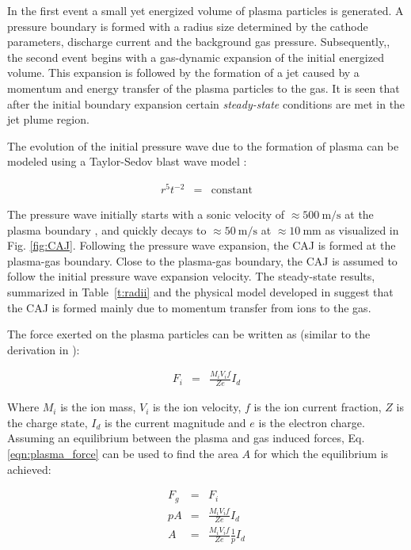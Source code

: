 \documentclass[a4paper]{iacas}%
\begin{document}
In the first event a small yet energized volume of plasma particles is generated. A pressure boundary is formed with a radius size determined by the cathode parameters, discharge current and the background gas pressure.
Subsequently,\cite{boxman1990momentum}, the second event begins with a gas-dynamic expansion of the initial energized volume. This expansion is followed by the formation of a jet caused by a momentum and energy transfer of the plasma particles to the gas. It is seen that after the initial boundary expansion certain \textit{steady-state} conditions are met in the jet plume region. 

The evolution of the initial pressure wave due to the formation of plasma can be modeled using a Taylor-Sedov blast wave model \cite{TAYLOR,SEDOV}: 

\begin{eqnarray}\label{eqn:taylor_sedov}
r^5 t^{-2} &=& \mathrm{constant}
\end{eqnarray}

\noindent The pressure wave initially starts with a sonic velocity of $\approx 500~\mathrm{m/s}$ at the plasma boundary \cite{KRClose}, and quickly decays to $\approx 50~\mathrm{m/s}$ \cite{KR,KRFar} at $\approx 10~\mathrm{mm}$ as visualized in Fig. \ref{fig:CAJ}. Following the pressure wave expansion, the CAJ is formed at the plasma-gas boundary. Close to the plasma-gas boundary, the CAJ is assumed to follow the initial pressure wave expansion velocity. The steady-state results, summarized in Table~\ref{t:radii} and the physical model developed in \cite{KRClose} suggest that the CAJ is formed mainly due to momentum transfer from ions to the gas.


The force exerted on the plasma particles can be written as (similar to the derivation in \cite{boxman1990momentum}):

\begin{eqnarray}\label{eqn:plasma_force}
	F_i &= &\frac{M_i V_i f}{Z e} I_d
\end{eqnarray}

Where $M_i$ is the ion mass, $V_i$ is the ion velocity, $f$ is the ion current fraction, $Z$ is the charge state, $I_d$ is the current magnitude and $e$ is the electron charge.
Assuming an equilibrium between the plasma and gas induced forces, Eq. \eqref{eqn:plasma_force} can be used to find the area $A$ for which the equilibrium is achieved:

\begin{eqnarray}\label{eqn:rel_equiv_force}
	F_g & = & F_i \\
	p A & = & \frac{M_i V_i f}{Z e} I_d\\
	A & = & \frac{M_i V_i f}{Z e} \frac{1}{p} I_d
\end{eqnarray}
\end{document}
